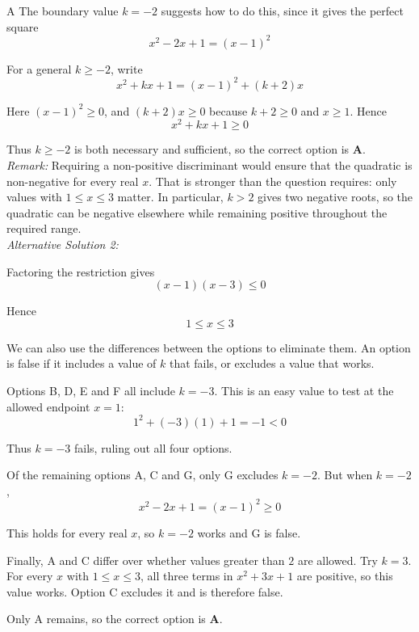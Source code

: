 \documentclass[11pt,a4paper]{article}
\begin{document}
\begin{enumerate}[label=\textbf{\arabic*.},leftmargin=*,itemsep=0pt,start=10]
\begin{djsSolution}{A}
The boundary value $k=-2$ suggests how to do this, since it gives the perfect square
\[
x^2-2x+1=(x-1)^2
\]

For a general $k\ge-2$, write
\[
x^2+kx+1=(x-1)^2+(k+2)x
\]

Here $(x-1)^2\ge0$, and $(k+2)x\ge0$ because $k+2\ge0$ and $x\ge1$. Hence
\[
x^2+kx+1\ge0
\]

Thus $k\ge-2$ is both necessary and sufficient, so the correct option is \textbf{A}.\\[5pt]

\textit{Remark:} Requiring a non-positive discriminant would ensure that the quadratic is non-negative for every real $x$. That is stronger than the question requires: only values with $1\le x\le3$ matter. In particular, $k>2$ gives two negative roots, so the quadratic can be negative elsewhere while remaining positive throughout the required range.\\[5pt]

\textit{Alternative Solution 2:}

Factoring the restriction gives
\[
(x-1)(x-3)\le0
\]

Hence
\[
1\le x\le3
\]

We can also use the differences between the options to eliminate them. An option is false if it includes a value of $k$ that fails, or excludes a value that works.

Options B, D, E and F all include $k=-3$. This is an easy value to test at the allowed endpoint $x=1$:
\[
1^2+(-3)(1)+1=-1<0
\]

Thus $k=-3$ fails, ruling out all four options.

Of the remaining options A, C and G, only G excludes $k=-2$. But when $k=-2$,
\[
x^2-2x+1=(x-1)^2\ge0
\]

This holds for every real $x$, so $k=-2$ works and G is false.

Finally, A and C differ over whether values greater than $2$ are allowed. Try $k=3$. For every $x$ with $1\le x\le3$, all three terms in $x^2+3x+1$ are positive, so this value works. Option C excludes it and is therefore false.

Only A remains, so the correct option is \textbf{A}.
\end{djsSolution}
\end{enumerate}
\clearpage
\thispagestyle{djssolutions}
\vspace*{8pt}
\end{document}
